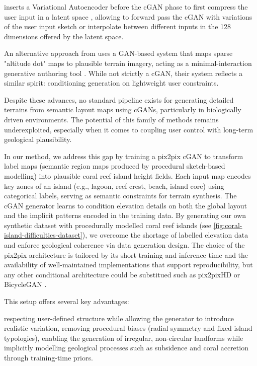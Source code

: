  inserts a Variational Autoencoder \cite{Kingma2022} before the cGAN phase to first compress the user input in a latent space \cite{Naik2022}, allowing to forward pass the cGAN with variations of the user input sketch or interpolate between different inputs in the 128 dimensions offered by the latent space. 

An alternative approach from  uses a GAN-based system that maps sparse "altitude dot" maps to plausible terrain imagery, acting as a minimal-interaction generative authoring tool \cite{Voulgaris2021}. While not strictly a cGAN, their system reflects a similar spirit: conditioning generation on lightweight user constraints. 

Despite these advances, no standard pipeline exists for generating detailed terrains from semantic layout maps using cGANs, particularly in biologically driven environments. The potential of this family of methods remains underexploited, especially when it comes to coupling user control with long-term geological plausibility.

\midConclusion

In our method, we address this gap by training a pix2pix cGAN to transform label maps (semantic region maps produced by procedural sketch-based modelling) into plausible coral reef island height fields. Each input map encodes key zones of an island (e.g., lagoon, reef crest, beach, island core) using categorical labels, serving as semantic constraints for terrain synthesis. The cGAN generator learns to condition elevation details on both the global layout and the implicit patterns encoded in the training data. By generating our own synthetic dataset with procedurally modelled coral reef islands (see \cref{fig:coral-island-difficulties-dataset}), we overcome the shortage of labelled elevation data and enforce geological coherence via data generation design. The choice of the pix2pix architecture is tailored by its short training and inference time and the availability of well-maintained implementations that support reproducibility, but any other conditional architecture could be substitued such as pix2pixHD or BicycleGAN \cite{Wang2018,Zhu2018NN}.

This setup offers several key advantages: 
\begin{Itemize}
    \Item{} respecting user-defined structure while allowing the generator to introduce realistic variation,
    \Item{} removing procedural biases (radial symmetry and fixed island typologies),
    \Item{} enabling the generation of irregular, non-circular landforms while implicitly modelling geological processes such as subsidence and coral accretion through training-time priors.
\end{Itemize}


